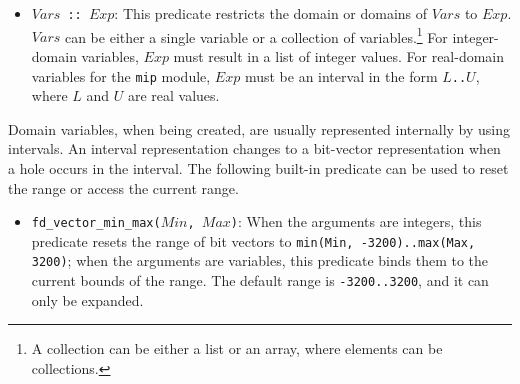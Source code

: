 \begin{itemize}
\item \texttt{$Vars$ :: $Exp$}: This predicate restricts the domain or domains of $Vars$ to $Exp$.  $Vars$ can be either a single variable or a collection of variables.\footnote{A collection can be either a list or an array, where elements can be collections.} For integer-domain variables, $Exp$ must result in a list of integer values. For real-domain variables for the {\tt mip} module, $Exp$ must be an interval in the form \texttt{$L$..$U$}, where $L$ and $U$ are real values.
\end{itemize}

Domain variables, when being created, are usually represented internally by using intervals. An interval representation changes to a bit-vector representation when a hole occurs in the interval. The following built-in predicate can be used to reset the range or access the current range.
\begin{itemize}
\item \texttt{fd\_vector\_min\_max($Min$, $Max$)}: When the arguments are integers, this predicate resets the range of bit vectors to \texttt{min(Min, -3200)..max(Max, 3200)}; when the arguments are variables, this predicate binds them to the current bounds of the range. The default range is {\tt -3200..3200}, and it can only be expanded.
\end{itemize}

